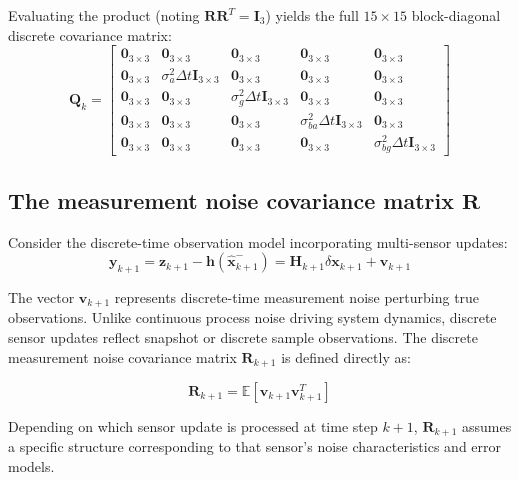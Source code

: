 \documentclass{article}
\begin{document}
	Evaluating the product (noting $\mathbf{R}\mathbf{R}^T = \mathbf{I}_3$) yields the full $15 \times 15$ block-diagonal discrete covariance matrix:
	\begin{equation}
		\mathbf{Q}_k = \begin{bmatrix}
			\mathbf{0}_{3 \times 3} & \mathbf{0}_{3 \times 3} & \mathbf{0}_{3 \times 3} & \mathbf{0}_{3 \times 3} & \mathbf{0}_{3 \times 3} \\
			\mathbf{0}_{3 \times 3} & \sigma_a^2 \Delta t \mathbf{I}_{3 \times 3} & \mathbf{0}_{3 \times 3} & \mathbf{0}_{3 \times 3} & \mathbf{0}_{3 \times 3} \\
			\mathbf{0}_{3 \times 3} & \mathbf{0}_{3 \times 3} & \sigma_g^2 \Delta t \mathbf{I}_{3 \times 3} & \mathbf{0}_{3 \times 3} & \mathbf{0}_{3 \times 3} \\
			\mathbf{0}_{3 \times 3} & \mathbf{0}_{3 \times 3} & \mathbf{0}_{3 \times 3} & \sigma_{ba}^2 \Delta t \mathbf{I}_{3 \times 3} & \mathbf{0}_{3 \times 3} \\
			\mathbf{0}_{3 \times 3} & \mathbf{0}_{3 \times 3} & \mathbf{0}_{3 \times 3} & \mathbf{0}_{3 \times 3} & \sigma_{bg}^2 \Delta t \mathbf{I}_{3 \times 3}
		\end{bmatrix}
	\end{equation}
	
	\subsection{The measurement noise covariance matrix $\mathbf{R}$}
	
	Consider the discrete-time observation model incorporating multi-sensor updates:
	\begin{equation}
		\mathbf{y}_{k+1} = \mathbf{z}_{k+1} - \mathbf{h}(\hat{\mathbf{x}}_{k+1}^-) = \mathbf{H}_{k+1} \delta\mathbf{x}_{k+1} + \mathbf{v}_{k+1}
	\end{equation}
	
	The vector $\mathbf{v}_{k+1}$ represents discrete-time measurement noise perturbing true observations. Unlike continuous process noise driving system dynamics, discrete sensor updates reflect snapshot or discrete sample observations. The discrete measurement noise covariance matrix $\mathbf{R}_{k+1}$ is defined directly as:
	
	\begin{equation}
		\mathbf{R}_{k+1} = \mathbb{E}\left[ \mathbf{v}_{k+1} \mathbf{v}_{k+1}^T \right]
	\end{equation}
	
	Depending on which sensor update is processed at time step $k+1$, $\mathbf{R}_{k+1}$ assumes a specific structure corresponding to that sensor's noise characteristics and error models.
	
\end{document}
